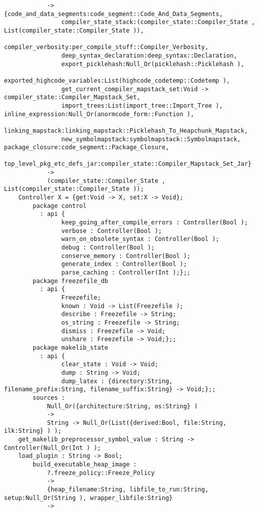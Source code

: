 \begin{verbatim}
            ->  {code_and_data_segments:code_segment::Code_And_Data_Segments,
                compiler_state_stack:(compiler_state::Compiler_State , List(compiler_state::Compiler_State )),
                compiler_verbosity:per_compile_stuff::Compiler_Verbosity,
                deep_syntax_declaration:deep_syntax::Declaration,
                export_picklehash:Null_Or(picklehash::Picklehash ),
                exported_highcode_variables:List(highcode_codetemp::Codetemp ),
                get_current_compiler_mapstack_set:Void -> compiler_state::Compiler_Mapstack_Set,
                import_trees:List(import_tree::Import_Tree ), inline_expression:Null_Or(anormcode_form::Function ),
                linking_mapstack:linking_mapstack::Picklehash_To_Heapchunk_Mapstack,
                new_symbolmapstack:symbolmapstack::Symbolmapstack, package_closure:code_segment::Package_Closure,
                top_level_pkg_etc_defs_jar:compiler_state::Compiler_Mapstack_Set_Jar}
            ->
            (compiler_state::Compiler_State , List(compiler_state::Compiler_State ));
    Controller X = {get:Void -> X, set:X -> Void};
        package control
          : api {
                keep_going_after_compile_errors : Controller(Bool );
                verbose : Controller(Bool );
                warn_on_obsolete_syntax : Controller(Bool );
                debug : Controller(Bool );
                conserve_memory : Controller(Bool );
                generate_index : Controller(Bool );
                parse_caching : Controller(Int );};;
        package freezefile_db
          : api {
                Freezefile;
                known : Void -> List(Freezefile );
                describe : Freezefile -> String;
                os_string : Freezefile -> String;
                dismiss : Freezefile -> Void;
                unshare : Freezefile -> Void;};;
        package makelib_state
          : api {
                clear_state : Void -> Void;
                dump : String -> Void;
                dump_latex : {directory:String, filename_prefix:String, filename_suffix:String} -> Void;};;
        sources :
            Null_Or({architecture:String, os:String} )
            ->
            String -> Null_Or(List({derived:Bool, file:String, ilk:String} ) );
    get_makelib_preprocessor_symbol_value : String -> Controller(Null_Or(Int ) );
    load_plugin : String -> Bool;
        build_executable_heap_image :
            ?.freeze_policy::Freeze_Policy
            ->
            {heap_filename:String, libfile_to_run:String, setup:Null_Or(String ), wrapper_libfile:String}
            ->

\end{verbatim}
